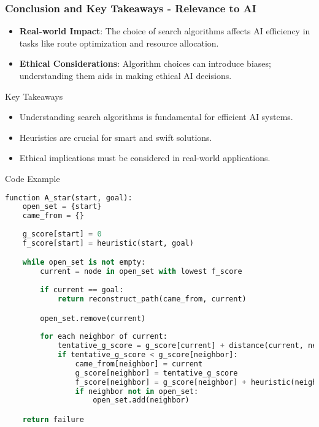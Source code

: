 \documentclass[aspectratio=169]{beamer}
\begin{document}
\begin{frame}[fragile]
    \frametitle{Conclusion and Key Takeaways - Relevance to AI}
    
    \begin{itemize}
        \item \textbf{Real-world Impact}: The choice of search algorithms affects AI efficiency in tasks like route optimization and resource allocation.
        \item \textbf{Ethical Considerations}: Algorithm choices can introduce biases; understanding them aids in making ethical AI decisions.
    \end{itemize}
    
    \begin{block}{Key Takeaways}
        \begin{itemize}
            \item Understanding search algorithms is fundamental for efficient AI systems.
            \item Heuristics are crucial for smart and swift solutions.
            \item Ethical implications must be considered in real-world applications.
        \end{itemize}
    \end{block}

    \begin{block}{Code Example}
        \begin{lstlisting}[language=Python]
function A_star(start, goal):
    open_set = {start}
    came_from = {}
    
    g_score[start] = 0
    f_score[start] = heuristic(start, goal)

    while open_set is not empty:
        current = node in open_set with lowest f_score
        
        if current == goal:
            return reconstruct_path(came_from, current)

        open_set.remove(current)
        
        for each neighbor of current:
            tentative_g_score = g_score[current] + distance(current, neighbor)
            if tentative_g_score < g_score[neighbor]:
                came_from[neighbor] = current
                g_score[neighbor] = tentative_g_score
                f_score[neighbor] = g_score[neighbor] + heuristic(neighbor, goal)
                if neighbor not in open_set:
                    open_set.add(neighbor)

    return failure
        \end{lstlisting}
    \end{block}
\end{frame}
\end{document}
